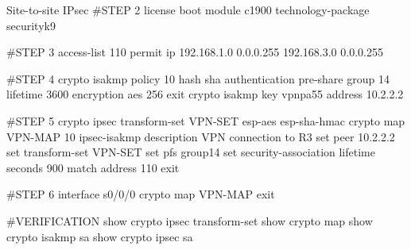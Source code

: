 \begin{sexylisting}{Site-to-site IPsec}
#STEP 2
license boot module c1900 technology-package securityk9

#STEP 3
access-list 110 permit ip 192.168.1.0 0.0.0.255 192.168.3.0 0.0.0.255

#STEP 4
crypto isakmp policy 10
	hash sha 
	authentication pre-share
	group 14
	lifetime 3600
	encryption aes 256
	exit
crypto isakmp key vpnpa55 address 10.2.2.2	

#STEP 5
crypto ipsec transform-set VPN-SET esp-aes esp-sha-hmac
crypto map VPN-MAP 10 ipsec-isakmp
	description VPN connection to R3
	set peer 10.2.2.2
	set transform-set VPN-SET
	set pfs group14
	set security-association lifetime seconds 900 
	match address 110
	exit

#STEP 6
interface s0/0/0
	crypto map VPN-MAP
	exit

#VERIFICATION
show crypto ipsec transform-set 
show crypto map
show crypto isakmp sa
show crypto ipsec sa		
\end{sexylisting}
